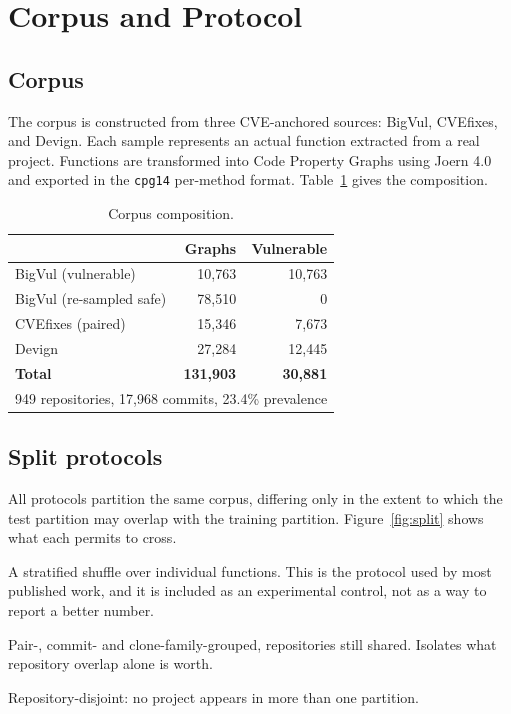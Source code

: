 \section{Corpus and Protocol}
\label{sec:method}

\subsection{Corpus}
The corpus is constructed from three CVE-anchored sources: BigVul, CVEfixes, and Devign. Each sample represents an actual function extracted from a real project. Functions are transformed into Code Property Graphs using Joern 4.0 and exported in the \texttt{cpg14} per-method format. Table~\ref{tab:corpus} gives the composition.

\begin{table}[h]
\centering
\caption{Corpus composition.}
\label{tab:corpus}
\begin{tabular}{lrr}
\toprule
& \textbf{Graphs} & \textbf{Vulnerable} \\
\midrule
BigVul (vulnerable)      & 10,763 & 10,763 \\
BigVul (re-sampled safe) & 78,510 & 0 \\
CVEfixes (paired)        & 15,346 & 7,673 \\
Devign                   & 27,284 & 12,445 \\
\midrule
\textbf{Total}           & \textbf{131,903} & \textbf{30,881} \\
\multicolumn{3}{l}{949 repositories, 17,968 commits, 23.4\% prevalence} \\
\bottomrule
\end{tabular}
\end{table}


\subsection{Split protocols}
\label{sec:protocols}
All protocols partition the same corpus, differing only in the extent to which the test partition may overlap with the training partition. Figure~\ref{fig:split} shows what each permits to cross.

\begin{description}[leftmargin=1.2em,itemsep=2pt]
  \item[\texttt{random}] A stratified shuffle over individual functions. This is the protocol used by most published work, and it is included as an experimental control, not as a way to report a better number.
  \item[\texttt{group}] Pair-, commit- and clone-family-grouped, repositories still shared. Isolates what repository overlap alone is worth.
  \item[\texttt{repo}] Repository-disjoint: no project appears in more than one partition.
\end{description}

